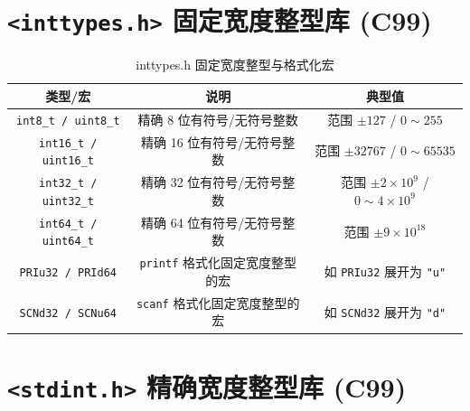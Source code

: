 \section{\texorpdfstring{\texttt{<inttypes.h>} 固定宽度整型库 (C99)}{<inttypes.h> 固定宽度整型库 (C99)}}

\begin{table}[H]
\centering
\small
\renewcommand{\arraystretch}{1.5}
\begin{tabulary}{\linewidth}{CCC}
\toprule
\textbf{类型/宏} & \textbf{说明} & \textbf{典型值} \\ \midrule
\texttt{int8\_t / uint8\_t} & 精确 8 位有符号/无符号整数 & 范围 $\pm 127$ / $0 \sim 255$ \\ 
\texttt{int16\_t / uint16\_t} & 精确 16 位有符号/无符号整数 & 范围 $\pm 32767$ / $0 \sim 65535$ \\ 
\texttt{int32\_t / uint32\_t} & 精确 32 位有符号/无符号整数 & 范围 $\pm 2\times 10^9$ / $0 \sim 4\times 10^9$ \\ 
\texttt{int64\_t / uint64\_t} & 精确 64 位有符号/无符号整数 & 范围 $\pm 9\times 10^{18}$ \\ 
\texttt{PRIu32 / PRId64} & \texttt{printf} 格式化固定宽度整型的宏 & 如 \texttt{PRIu32} 展开为 \texttt{"u"} \\ 
\texttt{SCNd32 / SCNu64} & \texttt{scanf} 格式化固定宽度整型的宏 & 如 \texttt{SCNd32} 展开为 \texttt{"d"} \\ \bottomrule
\end{tabulary}
\caption{inttypes.h 固定宽度整型与格式化宏}
\label{tab:inttypes}
\end{table}

\section{\texorpdfstring{\texttt{<stdint.h>} 精确宽度整型库 (C99)}{<stdint.h> 精确宽度整型库 (C99)}}

